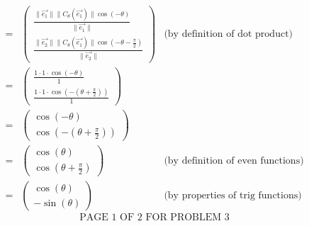 \documentclass[12pt]{article}
\newenvironment{problem}[2][Problem]
{
	\begin{trivlist} 
		\item[\hskip \labelsep {\bfseries #1 #2:}]
	}
{
	\end{trivlist}
	}
\newenvironment{solution}[1][Solution]
{
	\begin{trivlist} 
		\item[\hskip \labelsep {\itshape #1:}]
	}
	{
	\end{trivlist}
}
\begin{document}
\begin{problem}{3}
\begin{solution}
\begin{align*}
=& \begin{pmatrix} \frac{\| \vec{e_{1}} \| \| C_{\theta}(\vec{e_{1}}) \| \cos (-\theta)}{\| \vec{e_{1}} \|} \\ \frac{\| \vec{e_{2}} \| \| C_{\theta}(\vec{e_{1}}) \| \cos(-\theta - \frac{\pi}{2})}{\| \vec{e_{2}} \|} \end{pmatrix} & \text{(by definition of dot product)}\\
=& \begin{pmatrix} \frac{1 \cdot 1 \cdot \cos (-\theta)}{1} \\ \frac{1 \cdot 1 \cdot \cos (-(\theta +\frac{\pi}{2}))}{1} \end{pmatrix} &\\
=& \begin{pmatrix} \cos (-\theta)\\ \cos (-(\theta +\frac{\pi}{2})) \end{pmatrix} & \\
=&  \begin{pmatrix} \cos (\theta)\\ \cos (\theta +\frac{\pi}{2}) \end{pmatrix} & \text{(by definition of even functions)}\\
=& \begin{pmatrix} \cos (\theta)\\ -\sin (\theta) \end{pmatrix} & \text{(by properties of trig functions)}
\end{align*}
\newline
\newline
\newline
\newline
\newline
\newline
\newline
\newline
\newline
\newline
\newline
\[
\text{PAGE 1 OF 2 FOR PROBLEM 3}
\]
\end{solution}
\end{problem}
\end{document}
